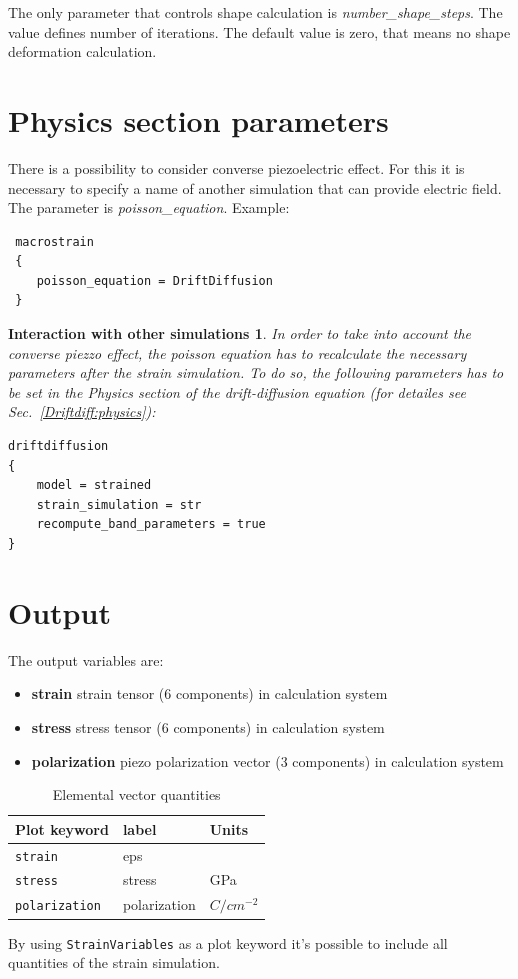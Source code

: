 The only parameter that controls shape calculation is
\textit{number\_shape\_steps}. The value defines number of iterations. The default value is zero, that means no shape deformation calculation.

\section{Physics section parameters}
There is a possibility to consider converse piezoelectric effect. For this it is necessary to specify a name of another simulation that can provide electric field.
The parameter is {\textit{poisson\_equation}}. Example:
\begin{verbatim}
 macrostrain
 {
    poisson_equation = DriftDiffusion
 }
\end{verbatim}
\newtheorem*{conv:piezo}{Interaction with other simulations}
\begin{conv:piezo}
 In order to take into account the converse piezzo effect, the poisson equation has to recalculate the necessary parameters after the strain simulation. To do so, the following parameters has to be set in the Physics section of the drift-diffusion equation (for detailes see Sec.~\ref{Driftdiff:physics}):
\begin{verbatim}
driftdiffusion
{
    model = strained
    strain_simulation = str
    recompute_band_parameters = true 
}
\end{verbatim}
\end{conv:piezo}

\section{Output} 
The output variables are:
\begin{itemize}
\item 
\textbf{strain}  strain tensor (6 components) in calculation system  
\item 
\textbf{stress}  stress tensor (6 components) in calculation system  
\item
\textbf{polarization}  piezo polarization vector (3 components) in calculation system    
\end{itemize}



\begin{table}[htb]
\center
\begin{tabular}{l|l|l}
\textbf{Plot keyword}  & \textbf{label}    & \textbf{Units} \\
\hline 
\texttt{strain}  & eps                     &  \\
\texttt{stress}      & stress                     & GPa \\
\texttt{polarization}      & polarization               & $C/cm^{-2}$ \\
\end{tabular}
\caption{Elemental vector quantities}
\label{table:elemental quantities}
\end{table}


By using \texttt{StrainVariables} as a plot keyword it's possible to include all quantities of the strain simulation.

